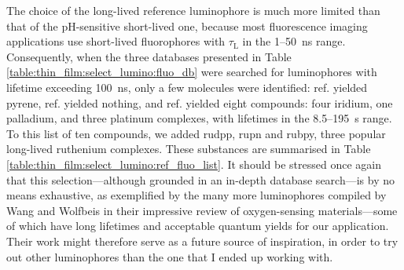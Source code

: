 The choice of the long-lived reference luminophore is much more limited than that of the pH-sensitive short-lived one, because most fluorescence imaging applications use short-lived fluorophores with $\tau_\mathrm{L}$ in the 1--50~ns range\cite{berezin2010, boens2012, houston2018}. Consequently, when the three databases presented in Table \ref{table:thin_film:select_lumino:fluo_db} were searched for luminophores with lifetime exceeding 100~ns, only a few molecules were identified: ref. \cite{molecular_fluorescence_app} yielded pyrene, ref. \cite{fluodb_maxplanck} yielded nothing, and ref. \cite{fluodb_tugraz} yielded eight compounds: four iridium, one palladium, and three platinum complexes, with lifetimes in the 8.5--195~\textmu{}s range. To this list of ten compounds, we added \gls{rudpp}, \gls{rupn} and \gls{rubpy}, three popular long-lived ruthenium complexes. These substances are summarised in Table \ref{table:thin_film:select_lumino:ref_fluo_list}. It should be stressed once again that this selection---although grounded in an in-depth database search---is by no means exhaustive, as exemplified by the many more luminophores compiled by Wang and Wolfbeis in their impressive review of oxygen-sensing materials\cite{wang2014wolfbeis}---some of which have long lifetimes and acceptable quantum yields for our application. Their work might therefore serve as a future source of inspiration, in order to try out other luminophores than the one that I ended up working with.


